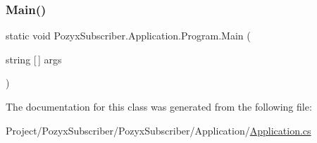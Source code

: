 \subsubsection{\texorpdfstring{Main()}{Main()}}
{\footnotesize\ttfamily static void Pozyx\+Subscriber.\+Application.\+Program.\+Main (\begin{DoxyParamCaption}\item[{string \mbox{[}$\,$\mbox{]}}]{args }\end{DoxyParamCaption})\hspace{0.3cm}{\ttfamily [static]}}



The documentation for this class was generated from the following file\+:\begin{DoxyCompactItemize}
\item 
Project/\+Pozyx\+Subscriber/\+Pozyx\+Subscriber/\+Application/\hyperlink{_application_2_application_8cs}{Application.\+cs}\end{DoxyCompactItemize}
